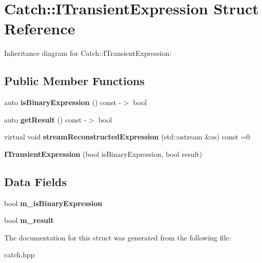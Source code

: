 \hypertarget{structCatch_1_1ITransientExpression}{}\section{Catch\+:\+:I\+Transient\+Expression Struct Reference}
\label{structCatch_1_1ITransientExpression}


Inheritance diagram for Catch\+:\+:I\+Transient\+Expression\+:
\subsection*{Public Member Functions}
\begin{DoxyCompactItemize}
\item 
\mbox{\label{structCatch_1_1ITransientExpression_a3b436e13a0a6d3522bbf70d4e31deb22}} 
auto {\bfseries is\+Binary\+Expression} () const -\/$>$ bool
\item 
\mbox{\label{structCatch_1_1ITransientExpression_a101c7db86c87eff93a8ff496720e6320}} 
auto {\bfseries get\+Result} () const -\/$>$ bool
\item 
\mbox{\label{structCatch_1_1ITransientExpression_aabe1889df9c6e639a24afb08d8a0fe9e}} 
virtual void {\bfseries stream\+Reconstructed\+Expression} (std\+::ostream \&os) const =0
\item 
\mbox{\label{structCatch_1_1ITransientExpression_aafe69572b7ed884e63ec81f58d4afd8c}} 
{\bfseries I\+Transient\+Expression} (bool is\+Binary\+Expression, bool result)
\end{DoxyCompactItemize}
\subsection*{Data Fields}
\begin{DoxyCompactItemize}
\item 
\mbox{\label{structCatch_1_1ITransientExpression_a75ce48da824d514d08152d396abb28d8}} 
bool {\bfseries m\+\_\+is\+Binary\+Expression}
\item 
\mbox{\label{structCatch_1_1ITransientExpression_a4646e2b5e0156e913653ec3b9b60c942}} 
bool {\bfseries m\+\_\+result}
\end{DoxyCompactItemize}


The documentation for this struct was generated from the following file\+:\begin{DoxyCompactItemize}
\item 
catch.\+hpp\end{DoxyCompactItemize}
